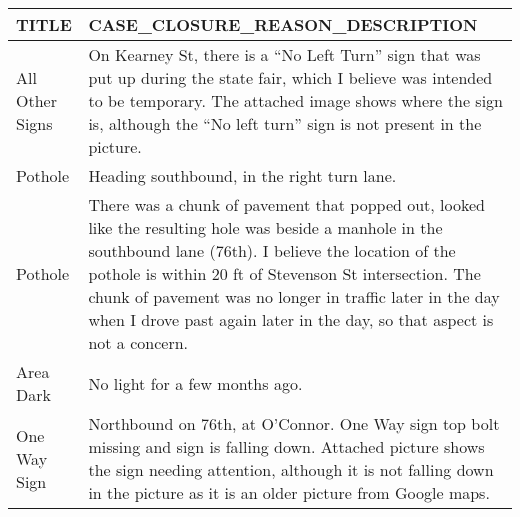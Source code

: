 \begin{center}
      \renewcommand{\arraystretch}{1.5}
      \begin{tabularx}{\textwidth}{l|X}
            \toprule
            TITLE           & CASE\_CLOSURE\_REASON\_DESCRIPTION                                                                                                                                                                                                                                                                                                                               \\
            \midrule
            All Other Signs & On Kearney St, there is a “No Left Turn” sign that was put up during the state fair, which I believe was intended to be temporary. The attached image shows where the sign is, although the “No left turn” sign is not present in the picture.                                                                                                                   \\
            \hline
            Pothole         & Heading southbound, in the right turn lane.                                                                                                                                                                                                                                                                                                                      \\
            \hline
            Pothole         & There was a chunk of pavement that popped out, looked like the resulting hole was beside a manhole in the southbound lane (76th). I believe the location of the pothole is within 20 ft of Stevenson St intersection. The chunk of pavement was no longer in traffic later in the day when I drove past again later in the day, so that aspect is not a concern. \\
            \hline
            Area Dark       & No light for a few months ago.                                                                                                                                                                                                                                                                                                                                   \\
            \hline
            One Way Sign    & Northbound on 76th, at O'Connor. One Way sign top bolt missing and sign is falling down. Attached picture shows the sign needing attention, although it is not falling down in the picture as it is an older picture from Google maps.                                                                                                                           \\
            \bottomrule
      \end{tabularx}
\end{center}

